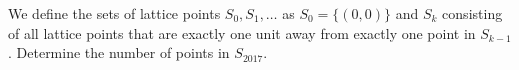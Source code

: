 We define the sets of lattice points $S_0,S_1,\ldots$ as $S_0=\{(0,0)\}$ and $S_k$ consisting of all lattice points that are exactly one unit away from exactly one point in $S_{k-1}$. Determine the number of points in $S_{2017}$.
